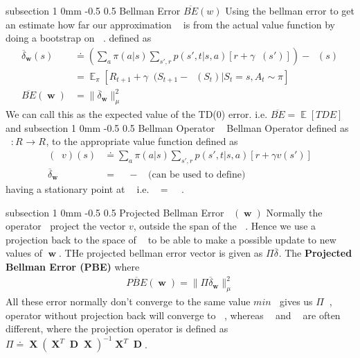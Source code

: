 \documentclass[twocolumn,11pt]{article}
\makeatletter
\DeclareMathOperator{\E}{\mathbb{E}}
\DeclareMathOperator{\w}{\textbf{w}}
\DeclareMathOperator{\state}{\mathcal{S}}
\DeclareMathOperator{\vp}{v_\pi} %
\DeclareMathOperator{\D}{ \textbf{D} }
\DeclareMathOperator{\Be}{B_\pi} %
\DeclareMathOperator{\VE}{\overline{VE}}
\DeclareMathOperator{\BE}{\overline{BE}}
\DeclareMathOperator{\PBE}{\overline{PBE}}
\DeclareMathOperator{\X}{\textbf{X}}
\DeclareMathOperator{\vw}{v_{\w}}
\DeclareMathOperator{\ns}{|\state|} %
\renewcommand{\subsection}{\@startsection
{subsection}%
{1}%
{0mm}%
{-0.5\baselineskip}%
{0.5\baselineskip}%
{\bfseries\color{blue}}} %
\makeatother
\begin{document}
\subsection{Bellman Error $\overline{BE}(w)$}
Using the bellman  error to get an  estimate  how far our approximation $\vw$ is from the actual value function by doing a bootstrap on $\vw$. defined as  
\begin{align*}
\overline{\delta}_{\w}(s) &\doteq \left( \sum_a \pi(a|s) \sum_{s',r} p(s',t|s,a) [r + \gamma \vw (s')]\right) - \vw(s)\\
&= \E_\pi \left[ R_{t+1} +  \gamma \vw(S_{t+1}  - \vw(S_t) | S_t = s,  A_t \sim \pi\right]\\
\overline{BE}(\w) &= \parallel \overline{\delta}_{\w}\parallel_\mu^2
\end{align*}
We can  call this as the  expected value of the  TD(0) error. i.e. $\overline{BE} = \E[TDE]$ and
\subsection{Bellman Operator $\Be$} 
Bellman  Operator defined as $\Be : R^{\ns} \rightarrow R^{\ns}$, to the appropriate value function defined as 
\begin{align*}
(\Be v)(s) &\doteq \sum_a \pi(a|s) \sum_{s',r} p(s',t|s,a) [r + \gamma v(s')]\\
\overline{\delta}_{\w} &= \Be \vw - \vw \text{ (can  be used  to define)}
\end{align*}
having a stationary point at $\vp$ i.e. $\vp = \Be\vp$.


\subsection{Projected Bellman  Error $\PBE(\w)$}
Normally the operator$\Be$ project the  vector $v$, outside the  span of the $\vw$. Hence we use a projection back to the  space of  $\vw$ to be able to make a  possible update to new values of  $\w$. THe projected bellman error vector is given as $\Pi \overline{\delta}_{\vw}$. The \textbf{Projected Bellman Error (PBE)} where  
\begin{align*}
\overline{PBE}(\w) = \parallel \Pi \overline{\delta}_{\w} \parallel_\mu^2
\end{align*}
All these error normally don't converge to the same value 
 $min \VE $ gives us $\Pi \vp$, $\Be $ operator without projection back will converge to $\vp$, whereas $\BE$ and $\PBE $ are often different, where the projection operator is defined as $\Pi  \doteq \X (\X^T\D\X)^{-1}\X^T\D$.
\end{document}
